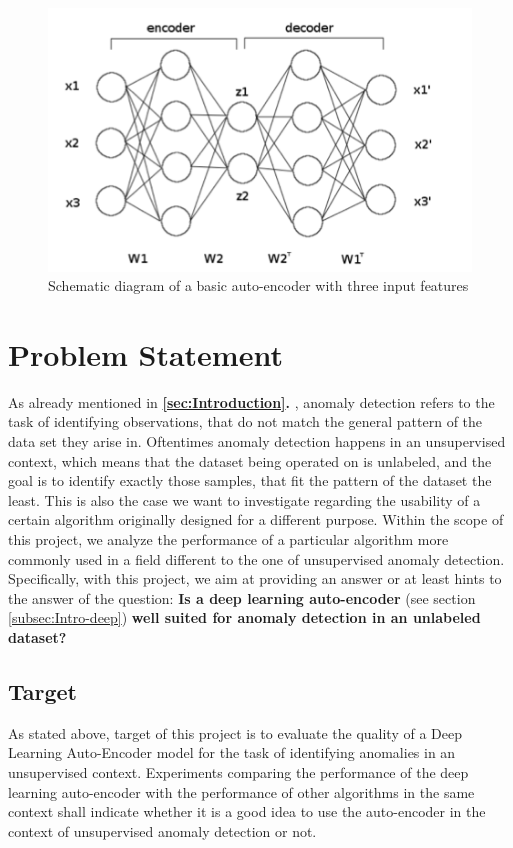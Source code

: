 \documentclass{vldb}
\begin{document}
\begin{figure}
\centering
\includegraphics[width=\linewidth]{"pics/auto-encoder"}
\caption{Schematic diagram of a basic auto-encoder with three input features}
\label{fig:auto-encoder}
\end{figure}

\section{Problem Statement} \label{problem_statement}
As already mentioned in \textbf{\ref{sec:Introduction}. }, anomaly detection refers to the task of identifying observations, that do not match the general pattern of the data set they arise in. Oftentimes anomaly detection happens in an unsupervised context, which means that the dataset being operated on is unlabeled, and the goal is to identify exactly those samples, that fit the pattern of the dataset the least. This is also the case we want to investigate regarding the usability of a certain algorithm originally designed for a different purpose. Within the scope of this project, we analyze the performance of a particular algorithm more commonly used in a field different to the one of unsupervised anomaly detection. Specifically, with this project, we aim at providing an answer or at least hints to the answer of the question: \textbf{Is a deep learning auto-encoder} (see section \ref{subsec:Intro-deep}) \textbf{well suited for anomaly detection in an unlabeled dataset?}
\subsection{Target}\label{target}
As stated above, target of this project is to evaluate the quality of a Deep Learning Auto-Encoder model for the task of identifying anomalies in an unsupervised context. Experiments comparing the performance of the deep learning auto-encoder with the performance of other algorithms in the same context shall indicate whether it is a good idea to use the auto-encoder in the context of unsupervised anomaly detection or not.
\end{document}

